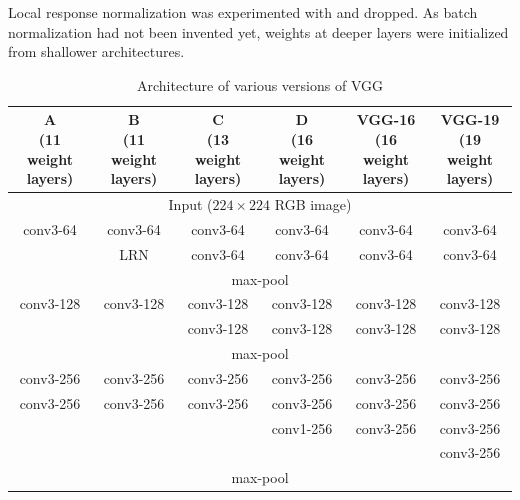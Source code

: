 \begin{remark}
    Local response normalization was experimented with and dropped.
    As batch normalization had not been invented yet, weights at deeper layers were initialized from shallower architectures.
\end{remark}

\begin{table}[H]
    \centering
    \caption{Architecture of various versions of VGG}
    \scriptsize
    \begin{tabular}{c|c|c|c|c|c}
        \toprule
        \makecell{\textbf{A}\\\tiny(11 weight layers)} &
        \makecell{\textbf{B}\\\tiny(11 weight layers)} &
        \makecell{\textbf{C}\\\tiny(13 weight layers)} &
        \makecell{\textbf{D}\\\tiny(16 weight layers)} &
        \makecell{\textbf{VGG-16}\\\tiny(16 weight layers)} &
        \makecell{\textbf{VGG-19}\\\tiny(19 weight layers)} \\
        \bottomrule
        \toprule
        \multicolumn{6}{c}{Input ($224 \times 224$ RGB image)} \\
        \midrule
        conv3-64 & conv3-64 & conv3-64 & conv3-64 & conv3-64 & conv3-64 \\
                 & LRN      & conv3-64 & conv3-64 & conv3-64 & conv3-64 \\
        \midrule
        \multicolumn{6}{c}{max-pool} \\
        \midrule
        conv3-128 & conv3-128 & conv3-128 & conv3-128 & conv3-128 & conv3-128 \\
                  &           & conv3-128 & conv3-128 & conv3-128 & conv3-128 \\
        \midrule
        \multicolumn{6}{c}{max-pool} \\
        \midrule
        conv3-256 & conv3-256 & conv3-256 & conv3-256 & conv3-256 & conv3-256 \\
        conv3-256 & conv3-256 & conv3-256 & conv3-256 & conv3-256 & conv3-256 \\
                  &           &           & conv1-256 & conv3-256 & conv3-256 \\
                  &           &           &           &           & conv3-256 \\
        \midrule
        \multicolumn{6}{c}{max-pool} \\

\end{tabular}
\end{table}
